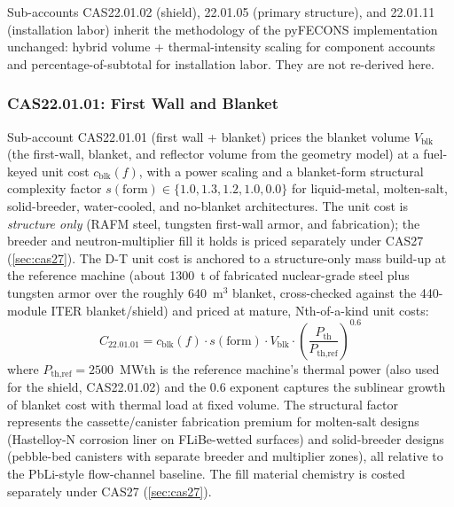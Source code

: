 \documentclass{article}
\begin{document}
Sub-accounts CAS22.01.02 (shield), 22.01.05 (primary structure),
and 22.01.11 (installation labor) inherit the
methodology of the pyFECONS
implementation \citep{woodruff2026} unchanged: hybrid volume +
thermal-intensity scaling for component accounts and
percentage-of-subtotal for installation labor. They are not
re-derived here.

\subsubsection{CAS22.01.01: First Wall and Blanket}
Sub-account CAS22.01.01 (first wall + blanket) prices the blanket volume
$V_{\text{blk}}$ (the first-wall, blanket, and reflector volume from the
geometry model) at a fuel-keyed unit cost $c_{\text{blk}}(f)$, with a
power scaling and a blanket-form structural complexity factor
$s(\mathrm{form}) \in \{1.0, 1.3, 1.2, 1.0, 0.0\}$ for liquid-metal,
molten-salt, solid-breeder, water-cooled, and no-blanket architectures. The unit cost
is \emph{structure only} (RAFM steel, tungsten first-wall armor, and
fabrication); the breeder and neutron-multiplier fill it holds is priced
separately under CAS27 (\cref{sec:cas27}). The D-T unit cost is anchored to a
structure-only mass build-up at the reference machine (about 1300~t of
fabricated nuclear-grade steel plus tungsten armor over the roughly
640~m$^3$ blanket, cross-checked against the 440-module ITER
blanket/shield) and priced at mature, Nth-of-a-kind unit costs:
\begin{equation}
\label{eq:cas2201}
C_{22.01.01} = c_{\text{blk}}(f) \cdot s(\mathrm{form}) \cdot V_{\text{blk}} \cdot \left( \frac{P_{\text{th}}}{P_{\text{th,ref}}} \right)^{0.6}
\end{equation}
where $P_{\text{th,ref}} = 2500$~MWth is the reference machine's thermal
power (also used for the shield, CAS22.01.02) and the 0.6 exponent captures
the sublinear growth of blanket cost with thermal load at fixed volume.
The structural factor represents the cassette/canister fabrication
premium for molten-salt designs (Hastelloy-N corrosion liner on
FLiBe-wetted surfaces) and solid-breeder designs (pebble-bed canisters
with separate breeder and multiplier zones), all relative to the
PbLi-style flow-channel baseline. The fill material chemistry is costed
separately under CAS27 (\cref{sec:cas27}).
\end{document}
